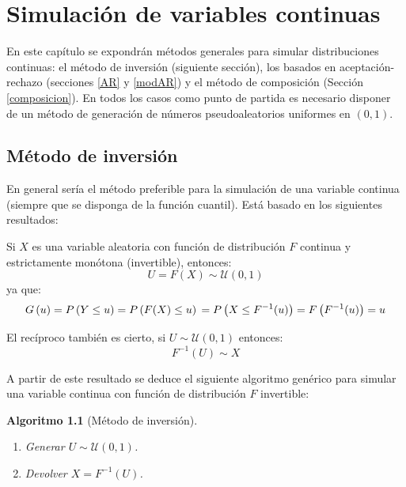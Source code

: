 \documentclass[
]{book}
\theoremstyle{break}
\newtheorem{conjecture}{Algoritmo}[chapter]
\theoremstyle{nonumberplain}
\begin{document}
\hypertarget{sim-con}{%
\chapter{Simulación de variables continuas}\label{sim-con}}

En este capítulo se expondrán métodos generales para simular distribuciones continuas: el método de inversión (siguiente sección), los basados en aceptación-rechazo (secciones \ref{AR} y \ref{modAR}) y el método de composición (Sección \ref{composicion}).
En todos los casos como punto de partida es necesario disponer de un método de generación de números pseudoaleatorios uniformes en \((0,1)\).

\hypertarget{inversion}{%
\section{Método de inversión}\label{inversion}}

En general sería el método preferible para la simulación de una variable continua (siempre que se disponga de la función cuantil).
Está basado en los siguientes resultados:

Si \(X\) es una variable aleatoria con función de distribución \(F\) continua y estrictamente monótona (invertible), entonces:
\[U = F\left( X \right) \sim \mathcal{U}(0, 1)\]
ya que:
\[G\left( u \right) = P\left( Y \leq u \right) 
= P\left( F(X) \leq u \right) \\
= P\left( X \leq F^{-1}(u) \right) 
= F\left( F^{-1}(u) \right) = u\]

El recíproco también es cierto, si \(U \sim \mathcal{U}(0, 1)\) entonces:
\[F^{-1}\left( U \right) \sim X\]

A partir de este resultado se deduce el siguiente algoritmo genérico para simular una variable continua con función de distribución \(F\) invertible:

\begin{conjecture}[Método de inversión]
\protect\hypertarget{cnj:inversion}{}\label{cnj:inversion}

\begin{enumerate}
\def\labelenumi{\arabic{enumi}.}
\item
  Generar \(U \sim \mathcal{U}(0, 1)\).
\item
  Devolver \(X = F^{-1}\left( U \right)\).
\end{enumerate}

\end{conjecture}
\end{document}
